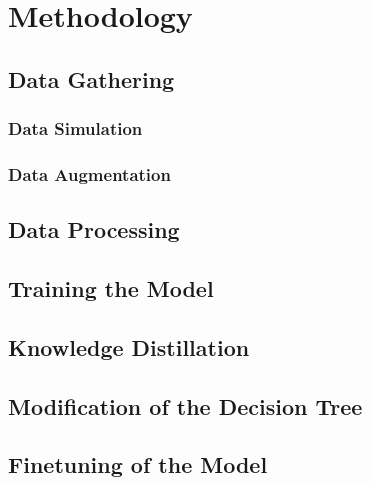 %
\chapter{Methodology}

\section{Data Gathering}

\subsection{Data Simulation}

\subsection{Data Augmentation}

\section{Data Processing}

\section{Training the Model}

\section{Knowledge Distillation}

\section{Modification of the Decision Tree}

\section{Finetuning of the Model}